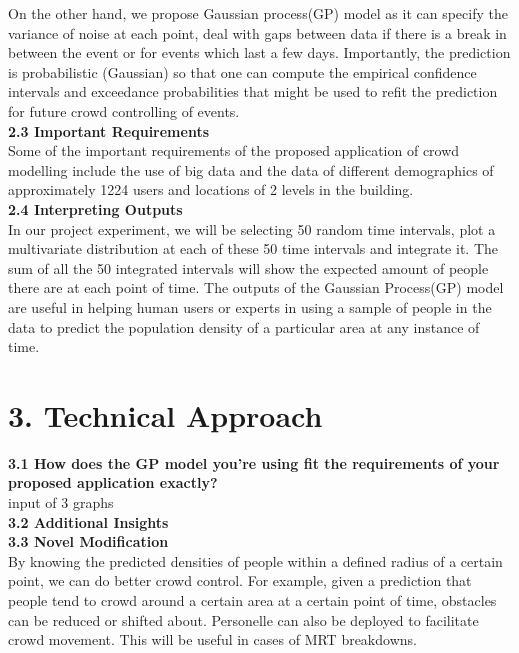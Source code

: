 \documentclass[letterpaper]{article}
\begin{document}
On the other hand, we propose Gaussian process(GP) model as it can specify the variance of noise at each point, deal with gaps between data if there is a break in between the event or for events which last a few days. Importantly, the prediction is probabilistic (Gaussian) so that one can compute the empirical confidence intervals and exceedance probabilities that might be used to refit the prediction for future crowd controlling of events. \\

{\bf2.3  Important Requirements} \\

Some of the important requirements of the proposed application of crowd modelling include the use of big data and the data of different demographics of approximately 1224 users and locations of 2 levels in the building. \\

{\bf2.4  Interpreting  Outputs} \\

In our project experiment, we will be selecting 50 random time intervals, plot a multivariate distribution at each of these 50 time intervals and integrate it. The sum of all the 50 integrated intervals will show the expected amount of people there are at each point of time. The outputs of the Gaussian Process(GP) model are useful in helping human users or experts in using a sample of people in the data to predict the population density of a particular area at any instance of time.

\section{3.  Technical Approach}

{\bf3.1  How does the GP model you’re using fit the requirements of your proposed application exactly?} \\

input of 3 graphs \\

{\bf3.2  Additional Insights} \\

{\bf3.3  Novel Modification} \\

By knowing the predicted densities of people within a defined radius of a certain point, we can do better crowd control. For example, given a prediction that people tend to crowd around a certain area at a certain point of time, obstacles can be reduced or shifted about. Personelle can also be deployed to facilitate crowd movement. This will be useful in cases of MRT breakdowns. \\
\end{document}
